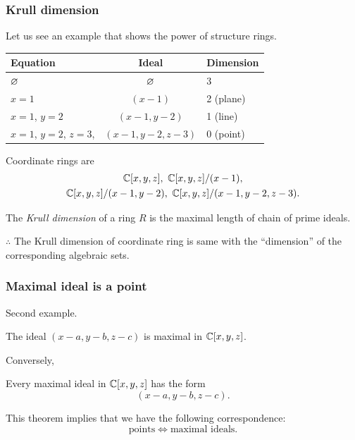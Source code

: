 \documentclass[10pt]{beamer}
\begin{document}
\begin{frame}
\frametitle{Krull dimension}
  Let us see an example that shows the power of structure rings.
  \begin{center}
  \begin{tabular}{lcl}
  Equation & Ideal & Dimension \\ \hline
  $\varnothing$ & $\varnothing$ & 3 \\
  $x=1$ & $(x-1)$ & 2 (plane)\\
  $x=1$, $y=2$ & $(x-1,y-2)$ & 1 (line)\\
  $x=1$, $y=2$, $z=3$, & $(x-1,y-2,z-3)$ & 0 (point)
  \end{tabular}
  \end{center}
  \pause
  Coordinate rings are
  \begin{gather*}
    \mathbb{C}[x,y,z],\ \mathbb{C}[x,y,z]/(x-1),\\
    \mathbb{C}[x,y,z]/(x-1,y-2),\ \mathbb{C}[x,y,z]/(x-1,y-2,z-3).
  \end{gather*}
  \begin{defn}
    The \emph{Krull dimension} of a ring $R$ is the maximal length of chain of prime ideals.
  \end{defn}
  $\therefore$ The Krull dimension of coordinate ring is same with the ``dimension'' of the corresponding algebraic sets.
\end{frame}

\begin{frame}
\frametitle{Maximal ideal is a point}
  Second example.
  \begin{thm}
  The ideal $(x-a,y-b,z-c)$ is maximal in $\mathbb{C}[x,y,z]$.
  \end{thm}
  \pause Conversely,
  \begin{thm}
    Every maximal ideal in $\mathbb{C}[x,y,z]$ has the form
    \[(x-a,y-b,z-c).\]
  \end{thm}
  \pause This theorem implies that we have the following correspondence:
  \[\text{points}\iff\text{maximal ideals}.\]
\end{frame}
\end{document}
